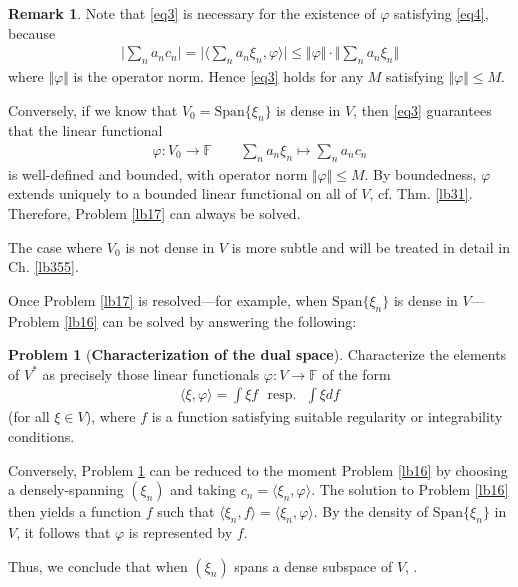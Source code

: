 \documentclass[12pt,b5paper,notitlepage]{article}
\theoremstyle{definition}
\newtheorem{rem}[df]{Remark}
\newtheorem{problem}[df]{Problem}
\theoremstyle{plain}
\newcommand{\Span}{\mathrm{Span}}
\newcommand{\bk}[1]{\langle {#1}\rangle}
\newcommand{\bigbk}[1]{\big\langle {#1}\big\rangle}
\newcommand{\Fbb}{\mathbb F}
\newcommand{\hqed}{\hfill\qedsymbol}
\numberwithin{equation}{section}
\begin{document}
\begin{rem}
Note that \eqref{eq3} is necessary for the existence of $\varphi$ satisfying \eqref{eq4}, because
\begin{align*}
\Big|\sum_n a_nc_n\Big|=\Big|\bigbk{\sum_n a_n\xi_n,\varphi} \Big|\leq \Vert\varphi\Vert\cdot \Big\Vert\sum_n a_n\xi_n\Big\Vert 
\end{align*}
where $\Vert\varphi\Vert$ is the operator norm. Hence \eqref{eq3} holds for any $M$ satisfying $\Vert\varphi\Vert\leq M$. 

Conversely, if we know that $V_0=\Span\{\xi_n\}$ is dense in $V$, then \eqref{eq3} guarantees that the linear functional
\begin{align*}
\varphi:V_0\rightarrow\Fbb\qquad \sum_n a_n\xi_n\mapsto \sum_n a_n c_n
\end{align*}
is well-defined and bounded, with operator norm $\Vert\varphi\Vert\leq M$. By boundedness, $\varphi$ extends uniquely to a bounded linear functional on all of $V$, cf. Thm. \ref{lb31}. Therefore, Problem \ref{lb17} can always be solved.

The case where $V_0$ is not dense in $V$ is more subtle and will be treated in detail in Ch. \ref{lb355}.   \hqed
\end{rem}


Once Problem \ref{lb17} is resolved---for example, when $\Span\{\xi_n\}$ is dense in $V$---Problem \ref{lb16} can be solved by answering the following:

\begin{problem}[\textbf{Characterization of the dual space}]\label{lb22}
Characterize the elements of $V^*$ as precisely those linear functionals $\varphi:V\rightarrow\Fbb$ of the form
\begin{align*}
\bk{\xi,\varphi}=\int\xi f{\text{~ resp.~ }} \int\xi df
\end{align*}
(for all $\xi\in V$), where $f$ is a function satisfying suitable regularity or integrability conditions.
\end{problem}


Conversely, Problem \ref{lb22} can be reduced to the moment Problem \ref{lb16} by choosing a densely-spanning $(\xi_n)$ and taking $c_n=\bk{\xi_n,\varphi}$. The solution to Problem \ref{lb16} then yields a function $f$ such that $\bk{\xi_n,f}=\bk{\xi_n,\varphi}$. By the density of $\Span\{\xi_n\}$ in $V$, it follows that $\varphi$ is represented by $f$. 

Thus, we conclude that when $(\xi_n)$ spans a dense subspace of $V$, .
\end{document}
